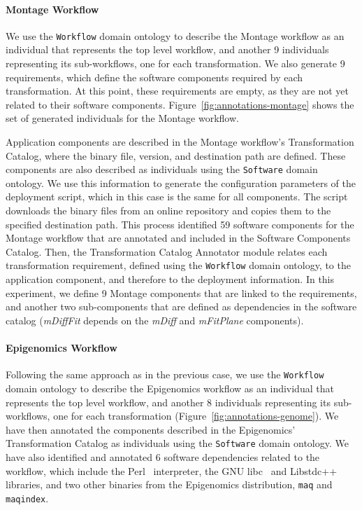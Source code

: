 \paragraph{\textbf{Montage Workflow}}
We use the \texttt{Workflow} domain ontology to describe the Montage workflow 
as an individual that represents the top level workflow, and another 9 individuals 
representing its sub-workflows, one for each transformation. We also generate 9 
requirements, which define the software components required by each transformation. 
At this point, these requirements are empty, as they are not yet related to their 
software components. Figure~\ref{fig:annotations-montage} shows the set of 
generated individuals for the Montage workflow.

Application components are described in the Montage workflow's Transformation 
Catalog, where the binary file, version, and destination path are defined. These 
components are also described as individuals using the \texttt{Software} domain 
ontology. We use this information to generate the configuration parameters of the 
deployment script, which in this case is the same for all components. The script 
downloads the binary files from an online repository and copies them to the specified 
destination path. This process identified 59 software components for the Montage 
workflow that are annotated and included in the Software Components Catalog.
Then, the Transformation Catalog Annotator module relates each transformation 
requirement, defined using the \texttt{Workflow} domain ontology, to the application 
component, and therefore to the deployment information. In this experiment, we 
define 9 Montage components that are linked to the requirements, and another two 
sub-components that are defined as dependencies in the software catalog 
(\emph{mDiffFit} depends on the \emph{mDiff} and \emph{mFitPlane} components).


\paragraph{\textbf{Epigenomics Workflow}}
Following the same approach as in the previous case, we use the \texttt{Workflow} 
domain ontology to describe the Epigenomics workflow as an individual that represents 
the top level workflow, and another 8 individuals representing its sub-workflows, one 
for each transformation (Figure~\ref{fig:annotations-genome}). We have then annotated 
the components described in the Epigenomics' Transformation Catalog as individuals 
using the \texttt{Software} domain ontology. We have also identified and annotated 6 
software dependencies related to the workflow, which include the Perl~\cite{perl} interpreter, 
the GNU libc~\cite{libc} and Libstdc++~\cite{libstdc} libraries, and two other binaries from 
the Epigenomics  distribution, \texttt{maq} and \texttt{maqindex}.

